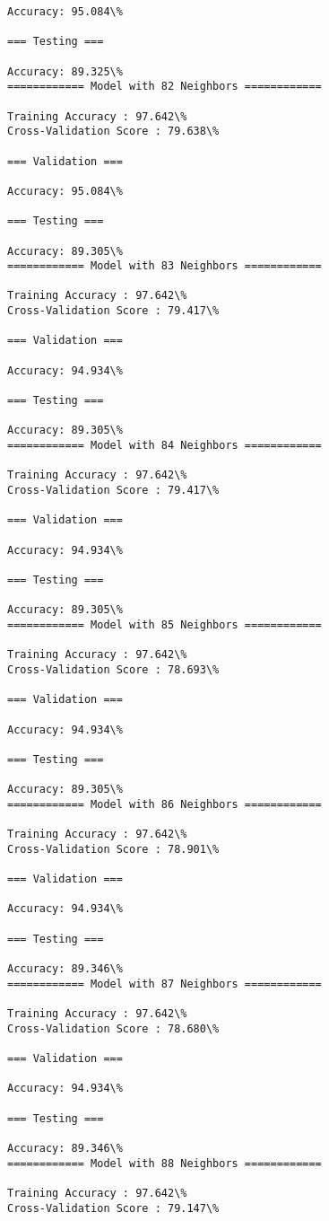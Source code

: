 \documentclass[11pt]{article}
\begin{document}
\begin{Verbatim}[commandchars=\\\{\}]
Accuracy: 95.084\%

=== Testing ===

Accuracy: 89.325\%
============ Model with 82 Neighbors ============

Training Accuracy : 97.642\%
Cross-Validation Score : 79.638\%

=== Validation ===

Accuracy: 95.084\%

=== Testing ===

Accuracy: 89.305\%
============ Model with 83 Neighbors ============

Training Accuracy : 97.642\%
Cross-Validation Score : 79.417\%

=== Validation ===

Accuracy: 94.934\%

=== Testing ===

Accuracy: 89.305\%
============ Model with 84 Neighbors ============

Training Accuracy : 97.642\%
Cross-Validation Score : 79.417\%

=== Validation ===

Accuracy: 94.934\%

=== Testing ===

Accuracy: 89.305\%
============ Model with 85 Neighbors ============

Training Accuracy : 97.642\%
Cross-Validation Score : 78.693\%

=== Validation ===

Accuracy: 94.934\%

=== Testing ===

Accuracy: 89.305\%
============ Model with 86 Neighbors ============

Training Accuracy : 97.642\%
Cross-Validation Score : 78.901\%

=== Validation ===

Accuracy: 94.934\%

=== Testing ===

Accuracy: 89.346\%
============ Model with 87 Neighbors ============

Training Accuracy : 97.642\%
Cross-Validation Score : 78.680\%

=== Validation ===

Accuracy: 94.934\%

=== Testing ===

Accuracy: 89.346\%
============ Model with 88 Neighbors ============

Training Accuracy : 97.642\%
Cross-Validation Score : 79.147\%


\end{Verbatim}
\end{document}
